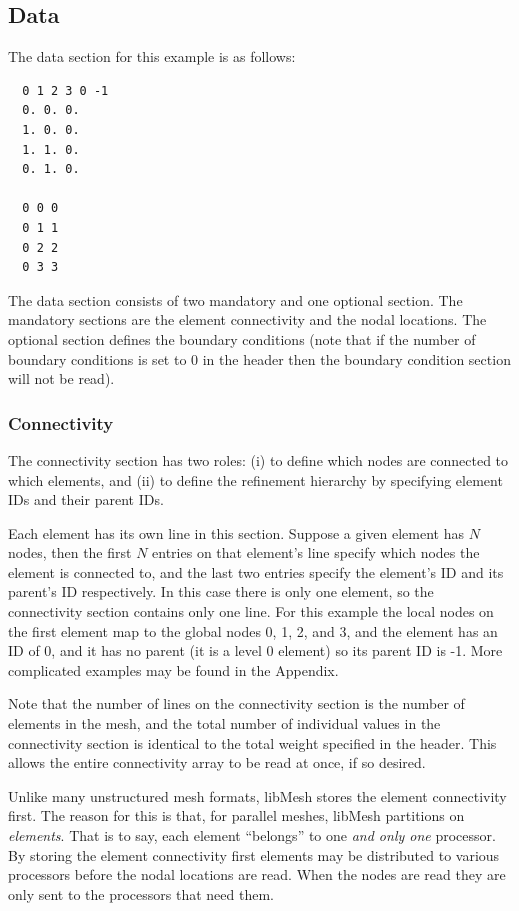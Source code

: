 \documentclass[12pt]{article}
\begin{document}
\subsection{Data}
The data section for this example is as follows:
\small
\begin{verbatim}
  0 1 2 3 0 -1
  0. 0. 0. 
  1. 0. 0.
  1. 1. 0.
  0. 1. 0.
  
  0 0 0
  0 1 1
  0 2 2
  0 3 3
\end{verbatim}
\normalsize

The data section consists of two mandatory and one optional section.  The mandatory sections are the element connectivity and the nodal locations.  The optional section defines the boundary conditions (note that if the number of boundary conditions is set to 0 in the header then the boundary condition section will not be read).

\subsubsection{Connectivity}
The connectivity section has two roles: (i) to define which nodes are connected to which elements, and (ii) to define the refinement hierarchy by specifying element IDs and their parent IDs.

Each element has its own line in this section. Suppose a given element has $N$ nodes, then the first $N$ entries on that element's line specify which nodes the element is connected to, and the last two entries specify the element's ID and its parent's ID respectively. In this case there is only one element, so the connectivity section contains only one line.  For this example the local nodes on the first element map to the global nodes 0, 1, 2, and 3, and the element has an ID of 0, and it has no parent (it is a level 0 element) so its parent ID is -1.  More complicated examples may be found in the Appendix.

Note that the number of lines on the connectivity section is the number of elements in the mesh, and the total number of individual values in the connectivity section is identical to the total weight specified in the header.  This allows the entire connectivity array to be read at once, if so desired.

Unlike many unstructured mesh formats, libMesh stores the element connectivity first.  The reason for this is that, for parallel meshes, libMesh partitions on \emph{elements}.  That is to say, each element ``belongs'' to one \emph{and only one} processor.  By storing the element connectivity first elements may be distributed to various processors before the nodal locations are read.  When the nodes are read they are only sent to the processors that need them.
\end{document}
